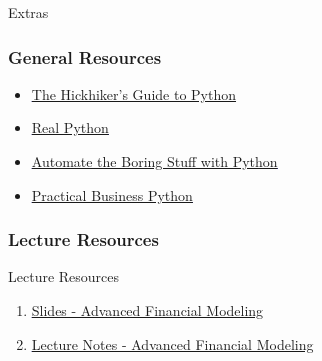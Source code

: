 \documentclass[handout, 11pt]{beamer}
\begin{document}
\begin{section}{Extras}
\begin{frame}
\frametitle{General Resources}
\begin{itemize}
\item \textcolor{blue}{\underline{\href{https://docs.python-guide.org/}{The Hickhiker's Guide to Python}}}
\vfill
\item \textcolor{blue}{\underline{\href{https://realpython.com/}{Real Python}}}
\vfill
\item \textcolor{blue}{\underline{\href{https://automatetheboringstuff.com/}{Automate the Boring Stuff with Python}}}
\vfill
\item \textcolor{blue}{\underline{\href{https://pbpython.com/}{Practical Business Python}}}
\end{itemize}
\end{frame}
\end{section}
\appendix
{}
\setcounter{finalframe}{\value{framenumber}}
\begin{frame}
\frametitle{Lecture Resources}
{
\begin{block}{Lecture Resources}
\begin{enumerate}
\item \textcolor{blue}{\underline{\href{https://nickderobertis.github.io/fin-model-course/\_static/generated/pdfs/S13 Advanced Financial Modeling.pdf}{Slides - Advanced Financial Modeling}}}
\item \textcolor{blue}{\underline{\href{https://nickderobertis.github.io/fin-model-course/\_static/generated/pdfs/LN13 Advanced Financial Modeling.pdf}{Lecture Notes - Advanced Financial Modeling}}}
\end{enumerate}
\vfill
\end{block}
}
\label{frames:resources}
\end{frame}
\setcounter{framenumber}{\value{finalframe}}
\end{document}
